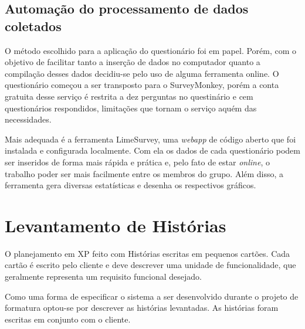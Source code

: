 \documentclass[a4paper,12pt,font=plain,header=plain]{abnt}
\begin{document}
  \section{Automação do processamento de dados coletados}
    O método escolhido para a aplicação do questionário foi em papel. Porém, com o objetivo de facilitar tanto a inserção de dados no computador quanto a compilação desses dados decidiu-se pelo uso de alguma ferramenta online. O questionário começou a ser transposto para o SurveyMonkey, porém a conta gratuita desse serviço é restrita a dez perguntas no questinário e cem questionários respondidos, limitações que tornam o serviço aquém das necessidades.

    Mais adequada é a ferramenta LimeSurvey, uma \textit{webapp} de código aberto que foi instalada e configurada localmente. Com ela os dados de cada questionário podem ser inseridos de forma mais rápida e prática e, pelo fato de estar \textit{online}, o trabalho poder ser mais facilmente entre os membros do grupo. Além disso, a ferramenta gera diversas estatísticas e desenha os respectivos gráficos.

\chapter{Levantamento de Histórias}

  O planejamento em XP feito com Histórias escritas em pequenos cartões. Cada cartão é escrito pelo cliente e deve descrever uma unidade de funcionalidade, que geralmente representa um requisito funcional desejado\cite{sato07}.

  Como uma forma de especificar o sistema a ser desenvolvido durante o projeto de formatura optou-se por descrever as histórias levantadas. As histórias foram escritas em conjunto com o cliente.
\end{document}
